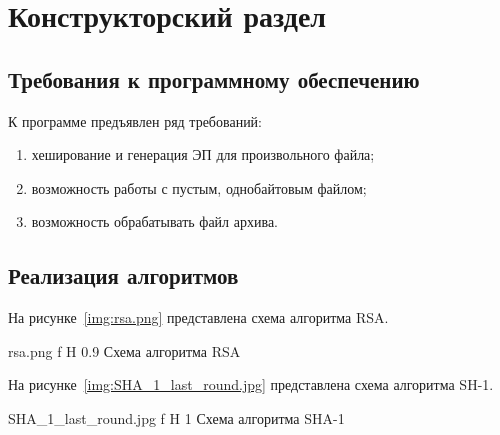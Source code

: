 \chapter{Конструкторский раздел}

\section{Требования к программному обеспечению}

К программе предъявлен ряд требований:
\begin{enumerate}
	\item хеширование и генерация ЭП для произвольного файла;
	\item возможность работы с пустым, однобайтовым файлом;
	\item возможность обрабатывать файл архива.
\end{enumerate}

\section{Реализация алгоритмов}

На рисунке~\ref{img:rsa.png} представлена схема алгоритма RSA.

	{rsa.png}
	{f}
	{H}
	{0.9\textwidth}
	{Схема алгоритма RSA}
	
На рисунке~\ref{img:SHA_1_last_round.jpg} представлена схема алгоритма SH-1.

	{SHA_1_last_round.jpg}
	{f}
	{H}
	{1\textwidth}
	{Схема алгоритма SHA-1}